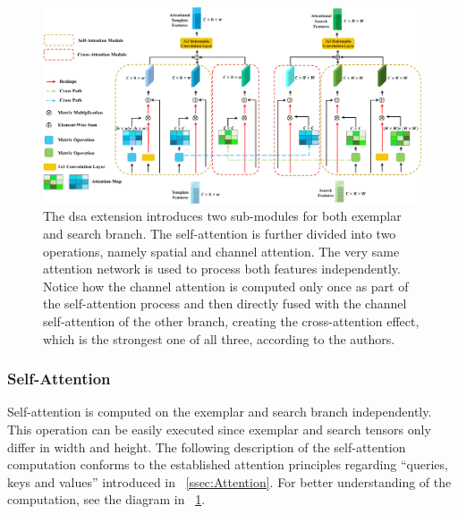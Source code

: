\begin{figure}[t]
    \centerline{\includegraphics[width=\linewidth]{figures/siamese_tracking/deformable_siamese_attention.pdf}}
    \caption[\gls{dsa} diagram]{The \gls{dsa} extension introduces two sub-modules for both exemplar and search branch. The self-attention is further divided into two operations, namely spatial and channel attention. The very same attention network is used to process both features independently. Notice how the channel attention is computed only once as part of the self-attention process and then directly fused with the channel self-attention of the other branch, creating the cross-attention effect, which is the strongest one of all three, according to the authors. }
    \label{fig:DeformableSiameseAttention}
\end{figure}

\subsubsection{Self-Attention}

Self-attention is computed on the exemplar and search branch independently. This operation can be easily executed since exemplar and search tensors only differ in width and height. The following description of the self-attention computation conforms to the established attention principles regarding ``queries, keys and values'' introduced in \sectiontext{}~\ref{ssec:Attention}. For better understanding of the computation, see the diagram in \figtext{}~\ref{fig:DeformableSiameseAttention}.

